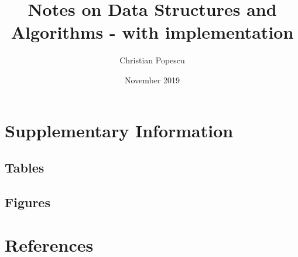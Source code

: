 \documentclass[a4paper,12pt]{book}
\begin{document}
\author{Christian Popescu}
\title{Notes on Data Structures and Algorithms - with implementation}
\date{November 2019}

\frontmatter
\maketitle
\tableofcontents
\setcounter{secnumdepth}{5}

\mainmatter










\backmatter
\begin{appendices}
	
	\chapter{Supplementary Information}
	
	\section{Tables}
	
	\section{Figures}
	
	\chapter{References}
	
\printbibliography
	
%	
	
\end{appendices}
\end{document}
